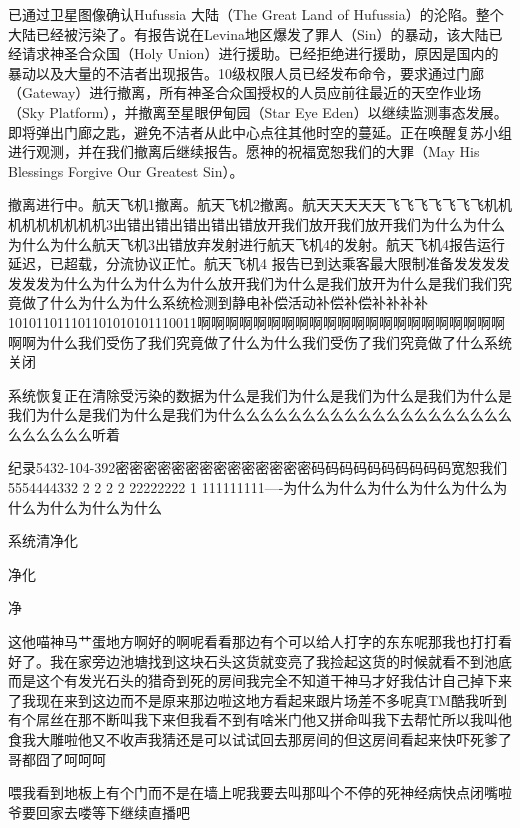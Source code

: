 
\begin{scpbox}

已通过卫星图像确认Hufussia 大陆（The Great Land of Hufussia）的沦陷。整个大陆已经被污染了。有报告说在Levina地区爆发了罪人（Sin）的暴动，该大陆已经请求神圣合众国（Holy Union）进行援助。已经拒绝进行援助，原因是国内的暴动以及大量的不洁者出现报告。10级权限人员已经发布命令，要求通过门廊（Gateway）进行撤离，所有神圣合众国授权的人员应前往最近的天空作业场（Sky Platform），并撤离至星眼伊甸园（Star Eye Eden）以继续监测事态发展。即将弹出门廊之匙，避免不洁者从此中心点往其他时空的蔓延。正在唤醒复苏小组进行观测，并在我们撤离后继续报告。愿神的祝福宽恕我们的大罪（May His Blessings Forgive Our Greatest Sin）。

\end{scpbox}


\begin{scpbox}

撤离进行中。航天飞机1撤离。航天飞机2撤离。航天天天天天飞飞飞飞飞飞飞机机机机机机机机机3出错出错出错出错出错放开我们放开我们放开我们为什么为什么为什么为什么航天飞机3出错放弃发射进行航天飞机4的发射。航天飞机4报告运行延迟，已超载，分流协议正忙。航天飞机4 报告已到达乘客最大限制准备发发发发发发发为什么为什么为什么为什么放开我们为什么是我们放开为什么是我们我们究竟做了什么为什么为什么系统检测到静电补偿活动补偿补偿补补补补101011011101101010101110011啊啊啊啊啊啊啊啊啊啊啊啊啊啊啊啊啊啊啊啊啊啊啊啊为什么我们受伤了我们究竟做了什么为什么我们受伤了我们究竟做了什么系统关闭

系统恢复正在清除受污染的数据为什么是我们为什么是我们为什么是我们为什么是我们为什么是我们为什么是我们为什么么么么么么么么么么么么么么么么么么么么么么么么么么听着

纪录5432-104-392密密密密密密密密密密密密密密码码码码码码码码码码宽恕我们5554444332 2 2 2 2 22222222 1 111111111—-为什么为什么为什么为什么为什么为什么为什么为什么为什么

系统清净化

净化

净

\end{scpbox}


\begin{scpbox}

这他喵神马艹蛋地方啊好的啊呢看看那边有个可以给人打字的东东呢那我也打打看好了。我在家旁边池塘找到这块石头这货就变亮了我捡起这货的时候就看不到池底而是这个有发光石头的猎奇到死的房间我完全不知道干神马才好我估计自己掉下来了我现在来到这边而不是原来那边啦这地方看起来跟片场差不多呢真TM酷我听到有个屌丝在那不断叫我下来但我看不到有啥米门他又拼命叫我下去帮忙所以我叫他食我大雕啦他又不收声我猜还是可以试试回去那房间的但这房间看起来快吓死爹了哥都囧了呵呵呵

喂我看到地板上有个门而不是在墙上呢我要去叫那叫个不停的死神经病快点闭嘴啦爷要回家去喽等下继续直播吧

\end{scpbox}

